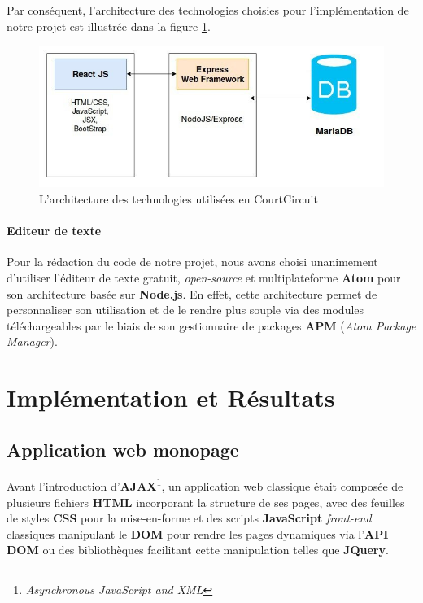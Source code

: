 \documentclass[a4paper,12pt]{report}
\theoremstyle{break}
\theoremstyle{break}
\theoremstyle{break}
\theoremstyle{break}
\theoremstyle{definition}
\theoremstyle{remark}
\begin{document}
Par conséquent, l'architecture des technologies choisies pour l'implémentation de notre projet est illustrée dans la figure \ref{fig:website_architecture}.

\begin{figure}[!ht]
  \centering
  \includegraphics[scale=0.5]{images/website_architecture.jpeg}
  \caption{L'architecture des technologies utilisées en CourtCircuit}
  \label{fig:website_architecture}
\end{figure}

\newpage

\subsubsection{Editeur de texte}
\noindent
Pour la rédaction du code de notre projet, nous avons choisi unanimement d'utiliser l'éditeur de texte gratuit, \textit{open-source} et multiplateforme \textbf{Atom} pour son architecture basée sur \textbf{Node.js}. En effet, cette architecture permet de personnaliser son utilisation et de le rendre plus souple via des modules téléchargeables par le biais de son gestionnaire de packages \textbf{APM} (\textit{Atom Package Manager}).
\chapter{Implémentation et Résultats}
\label{chap:implementation_resultats}
\section{Application web monopage}
Avant l'introduction d'\textbf{AJAX}\footnote{\textit{Asynchronous JavaScript and XML}}, un application web classique était composée de plusieurs fichiers \textbf{HTML} incorporant la structure de ses pages, avec des feuilles de styles \textbf{CSS} pour la mise-en-forme et des scripts \textbf{JavaScript} \textit{front-end} classiques manipulant le \textbf{DOM} pour rendre les pages dynamiques via l'\textbf{API DOM} ou des bibliothèques facilitant cette manipulation telles que \textbf{JQuery}.
\end{document}
